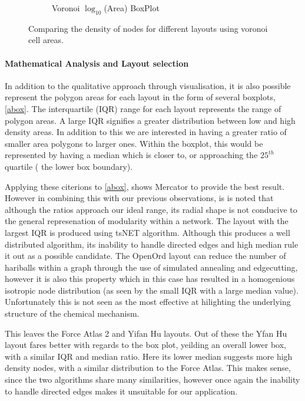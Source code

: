 \begin{figure}[H]
\begin{subfigure}[b]{.49\textwidth}
         \caption{Voronoi $\log_{10}$(Area) BoxPlot}
         \label{fig:abox}
     \end{subfigure}
      \hfill
        \caption{Comparing the density of nodes for different layouts using voronoi cell areas.}
        \label{fig:vornoicompare}
\end{figure}

\paragraph{Mathematical Analysis and Layout selection}
In addition to the qualitative approach through visualisation, it is also possible represent the polygon areas for each layout in the form of several boxplots, \autoref{abox}. The interquartile (IQR) range for each layout represents the range of polygon areas. A large IQR signifies a greater distribution between low and high density  areas. 
In addition to this we are interested in having a greater ratio of smaller area polygons to larger ones. Within the boxplot, this would be represented by having a median which is closer to, or approaching the $25^{th}$ quartile ( the lower box boundary).

Applying these citerions to \autoref{abox}, shows Mercator to provide the best result. However in combining this with our previous observations, is is noted that although the ratios approach our ideal range, its radial shape is not conducive to the general represenation of modularity within a network. The layout with the largest IQR is produced using tsNET algorithm. Although this produces a well distributed algorithm, its inability to handle directed edges and high median rule it out as a possible candidate. The OpenOrd layout can reduce the number of hariballs within a graph through the use of simulated annealing and edgecutting, however it is also this property which in this case has resulted in a homogenious isotropic node distribution (as seen by the small IQR with a large median value). Unfortunately this is not seen as the most effective at hilighting the underlying structure of the chemical mechanism. 

This leaves the Force Atlas 2 and Yifan Hu layouts. Out of these the Yfan Hu layout fares better with regards to the box plot, yeilding an overall lower box, with a similar IQR and median ratio. Here its lower median suggests more high density nodes, with a similar distribution to the Force Atlas. This makes sense, since the two algorithms share many similarities, however once again the inability to handle directed edges makes it unsuitable for our application. 


